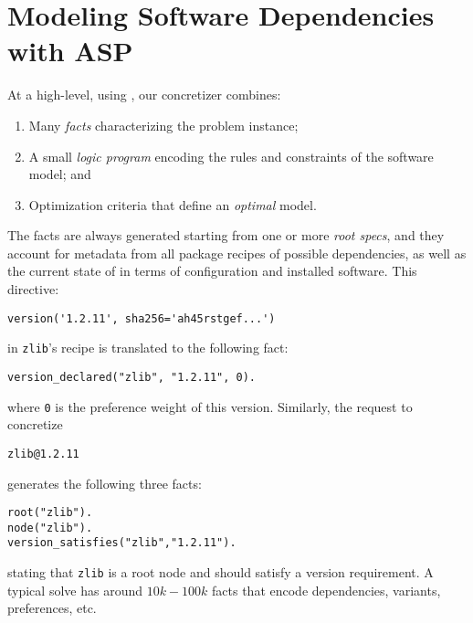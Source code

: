 \section{Modeling Software Dependencies with ASP}
\label{sec:asp-model}

At a high-level, using \clingo, our concretizer combines:
\begin{enumerate}
\item Many \emph{facts} characterizing the problem instance;
\item A small \emph{logic program} encoding the rules and constraints of the software model; and
\item Optimization criteria that define an {\it optimal} model.
\end{enumerate}
The facts are always generated starting from one or more \emph{root specs}, and they
account for metadata from all package recipes of possible dependencies, as well as
the current state of \spack{} in terms of configuration and installed software. This
directive:
%
\begin{verbatim}
version('1.2.11', sha256='ah45rstgef...')
\end{verbatim}
%
in \texttt{zlib}'s recipe is translated to the following fact:
%
\begin{verbatim}
version_declared("zlib", "1.2.11", 0).
\end{verbatim}
%
where {\tt 0} is the preference weight of this version. Similarly, the request to
concretize
%
\begin{verbatim}
zlib@1.2.11
\end{verbatim}
%
generates the following three facts:
%
\begin{verbatim}
root("zlib").
node("zlib").
version_satisfies("zlib","1.2.11").
\end{verbatim}
%
stating that \texttt{zlib} is a root node and should satisfy a version requirement. A
typical solve has around $10k-100k$ facts that encode dependencies, variants,
preferences, etc.


